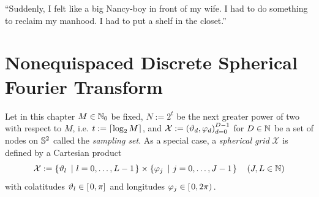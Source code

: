 \begin{savequote}[8cm]
  ``Suddenly, I felt like a big Nancy-boy in front of my wife. I had to do something to reclaim my manhood. I had to put a shelf in the closet.''
\end{savequote}
\makeatletter
\chapter{Nonequispaced Discrete Spherical Fourier Transform}
\label{DSFT}

Let in this chapter $M \in \mathbb{N}_{0}$ be fixed, $N := 2^t$ be the 
next greater power of two with respect to $M$, i.e. $t := {\left\lceil\log_2 M\right\rceil}$, and $\mathcal{X} := \left(\vartheta_d,\varphi_d\right)_{d=0}^{D-1}$ for $D \in \mathbb{N}$ be
a set of nodes on $\mathbb{S}^2$ called the \emph{sampling set}. As a special case, a \emph{spherical grid} 
$\mathcal{X}$ is defined by a Cartesian product 
\[
  \mathcal{X} := \left\{\vartheta_{l}\ \left|\ l=0,\ldots,L-1\right.\right\rbrace \times \left\{\varphi_{j}\ \left|\ j=0,\ldots,J-1\right.\right\rbrace \quad \left(J,L \in \mathbb{N}\right)
\]
with colatitudes $\vartheta_{l} \in \left[\left.0,\pi\right]\right.$ and longitudes $\varphi_{j} \in \left[\left.0,2\pi\right)\right.$.

